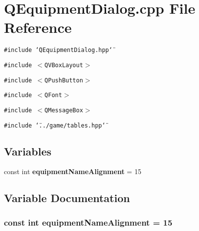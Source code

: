 \section{QEquipment\-Dialog.cpp File Reference}
\label{QEquipmentDialog_8cpp}
{\tt \#include \char`\"{}QEquipment\-Dialog.hpp\char`\"{}}\par
{\tt \#include $<$QVBox\-Layout$>$}\par
{\tt \#include $<$QPush\-Button$>$}\par
{\tt \#include $<$QFont$>$}\par
{\tt \#include $<$QMessage\-Box$>$}\par
{\tt \#include \char`\"{}../game/tables.hpp\char`\"{}}\par
\subsection*{Variables}
\begin{CompactItemize}
\item 
const int {\bf equipment\-Name\-Alignment} = 15
\end{CompactItemize}


\subsection{Variable Documentation}
\subsubsection{\setlength{\rightskip}{0pt plus 5cm}const int {\bf equipment\-Name\-Alignment} = 15}\label{QEquipmentDialog_8cpp_a0}


